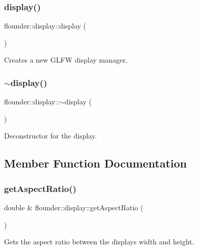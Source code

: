 \subsubsection{\texorpdfstring{display()}{display()}}
{\footnotesize\ttfamily flounder\+::display\+::display (\begin{DoxyParamCaption}{ }\end{DoxyParamCaption})}



Creates a new G\+L\+FW display manager. 

\mbox{\label{classflounder_1_1display_a272f9080af9079cbb3890b18c3e4d394}} 
\subsubsection{\texorpdfstring{$\sim$display()}{~display()}}
{\footnotesize\ttfamily flounder\+::display\+::$\sim$display (\begin{DoxyParamCaption}{ }\end{DoxyParamCaption})}



Deconstructor for the display. 



\subsection{Member Function Documentation}
\mbox{\label{classflounder_1_1display_a7b32aeb7809ad48663ce6eb4596b37a3}} 
\subsubsection{\texorpdfstring{get\+Aspect\+Ratio()}{getAspectRatio()}}
{\footnotesize\ttfamily double \& flounder\+::display\+::get\+Aspect\+Ratio (\begin{DoxyParamCaption}{ }\end{DoxyParamCaption})}



Gets the aspect ratio between the displays width and height. 

